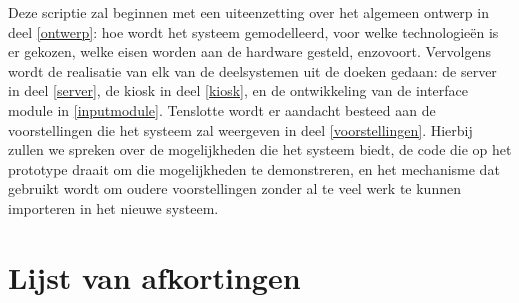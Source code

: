 Deze scriptie zal beginnen met een uiteenzetting over het algemeen ontwerp in deel \ref{ontwerp}: hoe wordt het systeem gemodelleerd, voor welke technologieën is er gekozen, welke eisen worden aan de hardware gesteld, enzovoort.
Vervolgens wordt de realisatie van elk van de deelsystemen uit de doeken gedaan: de server in deel \ref{server}, de kiosk in deel \ref{kiosk}, en de ontwikkeling van de interface module in \ref{inputmodule}.
Tenslotte wordt er aandacht besteed aan de voorstellingen die het systeem zal weergeven in deel \ref{voorstellingen}. Hierbij zullen we spreken over de mogelijkheden die het systeem biedt, de code die op het prototype draait om die mogelijkheden te demonstreren, en het mechanisme dat gebruikt wordt om oudere voorstellingen zonder al te veel werk te kunnen importeren in het nieuwe systeem.

\clearpage


%
%

\setlength\cftpartnumwidth{4em}
\tableofcontents

\clearpage


%
%

\chapter*{Lijst van afkortingen}

\acresetall
\clearpage

